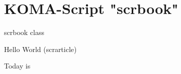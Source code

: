 \documentclass{scrbook}
\begin{document}
\chapter{KOMA-Script "scrbook"}
scrbook class

Hello World (scrarticle)

Today is \todaysname ~ \IsoToday
\end{document}
